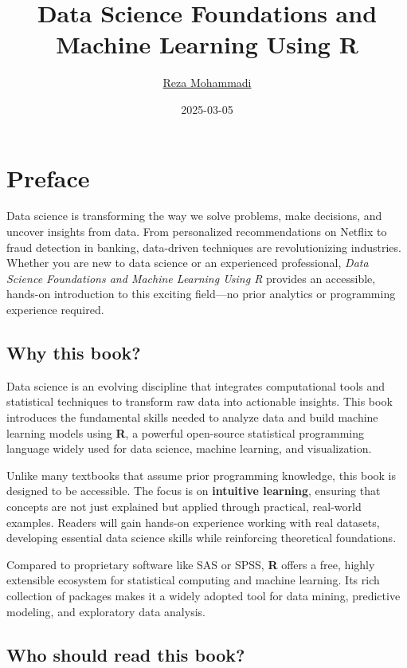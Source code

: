 \documentclass[
]{book}
\title{Data Science Foundations and Machine Learning Using R}
\author{\href{https://www.uva.nl/profile/a.mohammadi}{{Reza Mohammadi}}}
\date{2025-03-05}
\theoremstyle{definition}
\theoremstyle{definition}
\theoremstyle{definition}
\theoremstyle{definition}
\theoremstyle{remark}
\begin{document}
\maketitle

{
\setcounter{tocdepth}{1}
\tableofcontents
}
\chapter*{Preface}\label{preface}

Data science is transforming the way we solve problems, make decisions, and uncover insights from data. From personalized recommendations on Netflix to fraud detection in banking, data-driven techniques are revolutionizing industries. Whether you are new to data science or an experienced professional, \emph{Data Science Foundations and Machine Learning Using R} provides an accessible, hands-on introduction to this exciting field---no prior analytics or programming experience required.

\section*{Why this book?}\label{why-this-book}

Data science is an evolving discipline that integrates computational tools and statistical techniques to transform raw data into actionable insights. This book introduces the fundamental skills needed to analyze data and build machine learning models using \textbf{R}, a powerful open-source statistical programming language widely used for data science, machine learning, and visualization.

Unlike many textbooks that assume prior programming knowledge, this book is designed to be accessible. The focus is on \textbf{intuitive learning}, ensuring that concepts are not just explained but applied through practical, real-world examples. Readers will gain hands-on experience working with real datasets, developing essential data science skills while reinforcing theoretical foundations.

Compared to proprietary software like SAS or SPSS, \textbf{R} offers a free, highly extensible ecosystem for statistical computing and machine learning. Its rich collection of packages makes it a widely adopted tool for data mining, predictive modeling, and exploratory data analysis.

\section*{Who should read this book?}\label{who-should-read-this-book}
\end{document}
